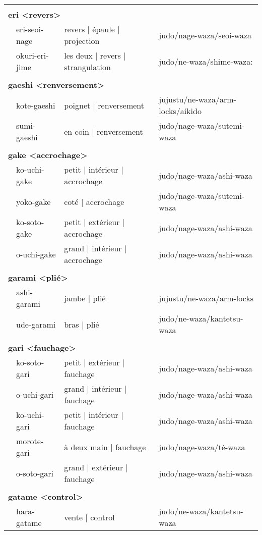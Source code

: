 \documentclass{article}%
\begin{document}
\begin{longtable}{rlll}
&&&\\%
\multicolumn{3}{l}{\textbf{eri <revers>}%
~%
}&\\%
&eri{-}seoi{-}nage&revers | épaule | projection&judo/nage{-}waza/seoi{-}waza\\%
&okuri{-}eri{-}jime&les deux | revers | strangulation&judo/ne{-}waza/shime{-}waza:\\%
&&&\\%
\multicolumn{3}{l}{\textbf{gaeshi <renversement>}%
~%
}&\\%
&kote{-}gaeshi&poignet | renversement&jujustu/ne{-}waza/arm{-}locks/aikido\\%
&sumi{-}gaeshi&en coin | renversement&judo/nage{-}waza/sutemi{-}waza\\%
&&&\\%
\multicolumn{3}{l}{\textbf{gake <accrochage>}%
~%
}&\\%
&ko{-}uchi{-}gake&petit | intérieur | accrochage&judo/nage{-}waza/ashi{-}waza\\%
&yoko{-}gake&coté | accrochage&judo/nage{-}waza/sutemi{-}waza\\%
&ko{-}soto{-}gake&petit | extérieur | accrochage&judo/nage{-}waza/ashi{-}waza\\%
&o{-}uchi{-}gake&grand | intérieur | accrochage&judo/nage{-}waza/ashi{-}waza\\%
&&&\\%
\multicolumn{3}{l}{\textbf{garami <plié>}%
~%
}&\\%
&ashi{-}garami&jambe | plié&jujustu/ne{-}waza/arm{-}locks\\%
&ude{-}garami&bras | plié&judo/ne{-}waza/kantetsu{-}waza\\%
&&&\\%
\multicolumn{3}{l}{\textbf{gari <fauchage>}%
~%
}&\\%
&ko{-}soto{-}gari&petit | extérieur | fauchage&judo/nage{-}waza/ashi{-}waza\\%
&o{-}uchi{-}gari&grand | intérieur | fauchage&judo/nage{-}waza/ashi{-}waza\\%
&ko{-}uchi{-}gari&petit | intérieur | fauchage&judo/nage{-}waza/ashi{-}waza\\%
&morote{-}gari&à deux main | fauchage&judo/nage{-}waza/té{-}waza\\%
&o{-}soto{-}gari&grand | extérieur | fauchage&judo/nage{-}waza/ashi{-}waza\\%
&&&\\%
\multicolumn{3}{l}{\textbf{gatame <control>}%
~%
}&\\%
&hara{-}gatame&vente | control&judo/ne{-}waza/kantetsu{-}waza\\%

\end{longtable}
\end{document}
